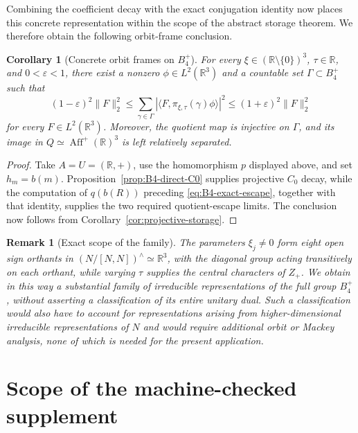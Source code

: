\documentclass[10pt,a4paper]{amsart}
\numberwithin{equation}{section}
\newtheorem{corollary}[theorem]{Corollary}
\newtheorem{remark}[theorem]{Remark}
\newcommand{\R}{\mathbb R}
\begin{document}
Combining the coefficient decay with the exact conjugation identity now
places this concrete representation within the scope of the abstract storage
theorem.  We therefore obtain the following orbit-frame conclusion.

\begin{corollary}[Concrete orbit frames on $B_4^+$]
\label{cor:B4-orbit-frame}
For every $\xi\in(\R\setminus\{0\})^3$, $\tau\in\R$, and
$0<\varepsilon<1$, there exist a nonzero $\phi\in L^2(\R^3)$ and a
countable set $\Gamma\subset B_4^+$ such that
\[
 (1-\varepsilon)^2\|F\|_2^2
 \leq\sum_{\gamma\in\Gamma}
 |\langle F,\pi_{\xi,\tau}(\gamma)\phi\rangle|^2
 \leq(1+\varepsilon)^2\|F\|_2^2
\]
for every $F\in L^2(\R^3)$.  Moreover, the quotient map is injective on
$\Gamma$, and its image in
$Q\simeq\operatorname{Aff}^+(\R)^3$ is left relatively separated.
\end{corollary}

\begin{proof}
Take $A=U=(\R,+)$, use the homomorphism $p$ displayed above, and set
$h_m=b(m)$.  Proposition~\ref{prop:B4-direct-C0} supplies projective $C_0$
decay, while the computation of $q(b(R))$ preceding
\eqref{eq:B4-exact-escape}, together with that identity, supplies the two
required quotient-escape limits.  The conclusion now follows from
Corollary~\ref{cor:projective-storage}.
\end{proof}

\begin{remark}[Exact scope of the family]
The parameters $\xi_j\neq0$ form eight open sign orthants in
$(N/[N,N])^\wedge\simeq\R^3$, with the diagonal group acting transitively on
each orthant, while varying $\tau$ supplies the central characters of $Z_+$.
We obtain in this way a substantial family of irreducible representations of
the full group $B_4^+$, without asserting a classification of its entire
unitary dual.  Such a classification would also have to account for
representations arising from higher-dimensional irreducible representations
of $N$ and would require additional orbit or Mackey analysis, none of which
is needed for the present application.
\end{remark}

\appendix

\section{Scope of the machine-checked supplement}
\label{app:lean}
\end{document}
